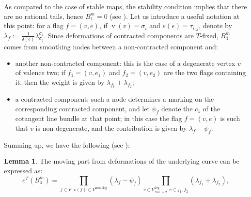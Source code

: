 \documentclass[11pt]{amsart}
\newcommand{\val}{\operatorname{val}}
\newcommand{\vv}{\operatorname{v}}
\theoremstyle{definition}
\newtheorem{lem}[thm]{Lemma}
\theoremstyle{definition}
\begin{document}
As compared to the case of stable maps, the stability condition implies that there are no rational tails, hence $B_1^m=0$ (see \cite[Lemma 7.2]{HolgerSpielberg}). 
Let us introduce a useful notation at this point: for a flag $f=(v,e)$, if $\vv(v)=\sigma_i$ and $\varepsilon(e)=\tau_{i,j}$, denote by $\lambda_f:=\frac{1}{\delta(e)}\lambda^{\sigma_i}_{\sigma_j}$.
Since deformations of contracted components are $T$-fixed, $B_4^m$ comes from smoothing nodes between a non-contracted component and:
\begin{itemize}
 \item another non-contracted component: this is the case of a degenerate vertex $v$ of valence two; if $f_1=(v,e_1)$ and $f_2=(v,e_2)$ are the two flags containing it, then the weight is given by $\lambda_{f_1}+\lambda_{f_2}$;
 \item a contracted component: such a node determines a marking on the corresponding contracted component, and let $\psi_f$ denote the $c_1$ of the cotangent line bundle at that point; in this case the flag $f=(v,e)$ is such that $v$ is non-degenerate, and the contribution is given by $\lambda_f-\psi_f$.
\end{itemize}
Summing up, we have the following (see \cite[Lemma 7.3]{HolgerSpielberg}):
\begin{lem}
 The moving part from deformations of the underlying curve can be expressed as:
 \[
  e^T(B_4^m)=\prod_{f\in F\colon v(f)\in V^{\text{non-deg}}}(\lambda_f-\psi_f)\prod_{v\in V^\text{deg}_{\val=2}\colon v\in f_1,f_2}(\lambda_{f_1}+\lambda_{f_2}),
 \]
\end{lem}
\end{document}
